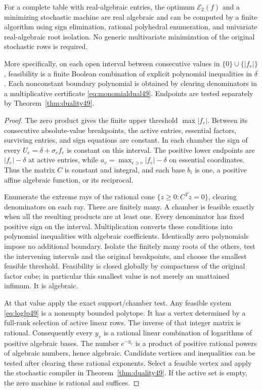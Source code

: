 \begin{theorem}\label{thm:algebraic49}
For a complete table with real-algebraic entries, the optimum
$\mathcal E_2(f)$ and a minimizing stochastic machine are real
algebraic and can be computed by a finite algorithm using sign
elimination, rational polyhedral enumeration, and univariate
real-algebraic root isolation. No generic multivariate minimization
of the original stochastic rows is required.

More specifically, on each open interval between consecutive values
in $\{0\}\cup\{|f_e|\}$, feasibility is a finite Boolean combination
of explicit polynomial inequalities in $\delta$. Each nonconstant
boundary polynomial is obtained by clearing denominators in a
multiplicative certificate \eqref{eq:monomialdual49}. Endpoints are
tested separately by Theorem~\ref{thm:duality49}.
\end{theorem}
\begin{proof}
The zero product gives the finite upper threshold $\max|f_e|$.
Between its consecutive absolute-value breakpoints, the active
entries, essential factors, surviving entries, and sign equations
are constant. In each chamber the sign of every $U_e=\delta+\sigma_e f_e$
is constant on this interval. The positive lower endpoints are
$|f_e|-\delta$ at active entries, while
$a_v=\max_{e\ni v}|f_e|-\delta$ on essential coordinates.
Thus the matrix $C$ is constant and integral, and each base $b_i$
is one, a positive affine algebraic function, or its reciprocal.

Enumerate the extreme rays of the rational cone
$\{z\ge0:C^Tz=0\}$, clearing denominators on each ray.
There are finitely many. A chamber is feasible exactly when all the
resulting products are at least one. Every denominator has fixed
positive sign on the interval. Multiplication converts these
conditions into polynomial inequalities with algebraic coefficients.
Identically zero polynomials impose no additional boundary.
Isolate the finitely many roots of the others, test the intervening
intervals and the original breakpoints, and choose the smallest
feasible threshold. Feasibility is closed globally by compactness of
the original factor cube; in particular this smallest value is not
merely an unattained infimum. It is algebraic.

At that value apply the exact support/chamber test. Any feasible
system \eqref{eq:loglp49} is a nonempty bounded polytope. It has a
vertex determined by a full-rank selection of active linear rows.
The inverse of that integer matrix is rational. Consequently every
$y_v$ is a rational linear combination of logarithms of positive
algebraic bases. The number $e^{-y_v}$ is a product of positive
rational powers of algebraic numbers, hence algebraic. Candidate
vertices and inequalities can be tested after clearing these
rational exponents. Select a feasible vertex and apply the stochastic
compiler in Theorem~\ref{thm:duality49}. If the active set is empty,
the zero machine is rational and suffices.
\end{proof}

